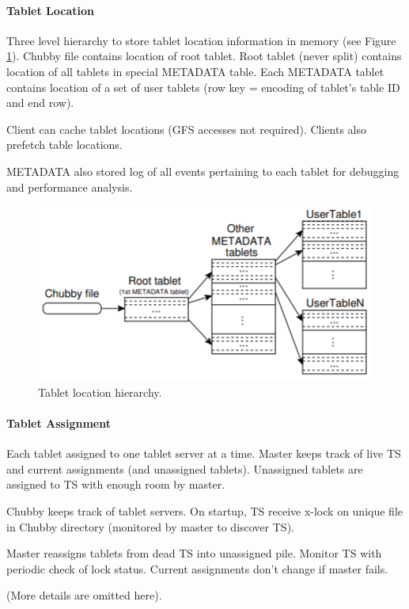 \paragraph{Tablet Location}
Three level hierarchy to store tablet location information in memory (see Figure \ref{fig:bt_loc}). Chubby file contains location of root tablet. Root tablet (never split) contains location of all tablets in special METADATA table. Each METADATA tablet contains location of a set of user tablets (row key = encoding of tablet's table ID and end row).

Client can cache tablet locations (GFS accesses not required). Clients also prefetch table locations.

METADATA also stored log of all events pertaining to each tablet for debugging and performance analysis.

\begin{figure}[h]
	\centering
	\includegraphics[scale=0.7]{images/3-bt_location.PNG}
	\caption{Tablet location hierarchy.}
	\label{fig:bt_loc}
\end{figure}

\paragraph{Tablet Assignment}
Each tablet assigned to one tablet server at a time. Master keeps track of live TS and current assignments (and unassigned tablets). Unassigned tablets are assigned to TS with enough room by master.

Chubby keeps track of tablet servers. On startup, TS receive x-lock on unique file in Chubby directory (monitored by master to discover TS).

Master reassigns tablets from dead TS into unassigned pile. Monitor TS with periodic check of lock status. Current assignments don't change if master fails.

(More details are omitted here).

